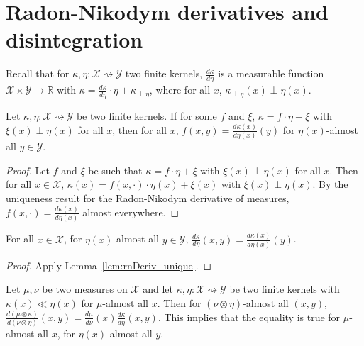 \chapter{Radon-Nikodym derivatives and disintegration}

Recall that for $\kappa, \eta : \mathcal X \rightsquigarrow \mathcal Y$ two finite kernels, $\frac{d \kappa}{d \eta}$ is a measurable function $\mathcal X \times \mathcal Y \to \mathbb{R}$ with $\kappa = \frac{d \kappa}{d \eta} \cdot \eta + \kappa_{\perp \eta}$, where for all $x$, $\kappa_{\perp \eta}(x) \perp \eta(x)$.

\begin{lemma}
  \label{lem:rnDeriv_unique}
  Let $\kappa, \eta : \mathcal X \rightsquigarrow \mathcal Y$ be two finite kernels. If for some $f$ and $\xi$, $\kappa = f \cdot \eta + \xi$ with $\xi(x) \perp \eta(x)$ for all $x$, then for all $x$, $f(x, y) = \frac{d \kappa(x)}{d \eta(x)}(y)$ for $\eta(x)$-almost all $y \in \mathcal Y$.
\end{lemma}

\begin{proof}
Let $f$ and $\xi$ be such that $\kappa = f \cdot \eta + \xi$ with $\xi(x) \perp \eta(x)$ for all $x$. Then for all $x \in \mathcal X$, $\kappa(x) = f(x, \cdot) \cdot \eta(x) + \xi(x)$ with $\xi(x) \perp \eta(x)$. By the uniqueness result for the Radon-Nikodym derivative of measures, $f(x, \cdot) = \frac{d \kappa(x)}{d \eta(x)}$ almost everywhere.
\end{proof}

\begin{corollary}
  \label{cor:rnDeriv_value}
  For all $x \in \mathcal X$, for $\eta(x)$-almost all $y \in \mathcal Y$, $\frac{d \kappa}{d \eta}(x, y) = \frac{d \kappa(x)}{d \eta(x)}(y)$.
\end{corollary}

\begin{proof}
Apply Lemma~\ref{lem:rnDeriv_unique}.
\end{proof}

\begin{lemma}
  \label{lem:rnDeriv_compProd}
  Let $\mu, \nu$ be two measures on $\mathcal X$ and let $\kappa, \eta : \mathcal X \rightsquigarrow \mathcal Y$ be two finite kernels with $\kappa(x) \ll \eta(x)$ for $\mu$-almost all $x$. Then for $(\nu \otimes \eta)$-almost all $(x, y)$, $\frac{d (\mu \otimes \kappa)}{d (\nu \otimes \eta)}(x,y) = \frac{d\mu}{d\nu}(x)\frac{d \kappa}{d \eta}(x,y)$.
  This implies that the equality is true for $\mu$-almost all $x$, for $\eta(x)$-almost all $y$.
\end{lemma}

